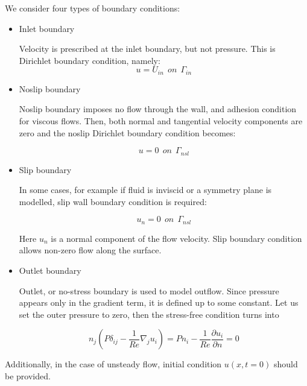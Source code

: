 We consider four types of boundary conditions:

\begin{itemize}
    \item Inlet boundary
    
    Velocity is prescribed at the inlet boundary, but not pressure. This is Dirichlet boundary condition, namely:
    \begin{equation}
    u = U_{in} \ \ on \ \ \Gamma_{in}
    \end{equation}
    
    \item Noslip boundary
    
    Noslip boundary imposes no flow through the wall, and adhesion condition for viscous flows. Then, both normal and tangential velocity components are zero and the noslip Dirichlet boundary condition becomes:
   
    \begin{equation}
    u = 0 \ \ on \ \ \Gamma_{nsl}
    \end{equation} 
    
    \item Slip boundary
    
    In some cases, for example if fluid is inviscid or a symmetry plane is modelled, slip wall boundary condition is required:
    
    \begin{equation}
    u_n = 0 \ \ on \ \ \Gamma_{nsl}
    \end{equation} 
    
    Here $u_n$ is a normal component of the flow velocity. Slip boundary condition allows non-zero flow along the surface.
    
    \item Outlet boundary
    
    Outlet, or no-stress boundary is used to model outflow. Since pressure appears only in the gradient term, it is defined up to some constant. Let us set the outer pressure to zero, then the stress-free condition turns into
    
    \begin{equation}
    n_j (P\delta_{ij} - \frac{1}{Re} \nabla_j u_i) = P n_i - \frac{1}{Re} \frac{\partial u_i}{\partial n} = 0
    \end{equation}
    
\end{itemize}

Additionally, in the case of unsteady flow, initial condition $u(x,t=0)$ should be provided.

